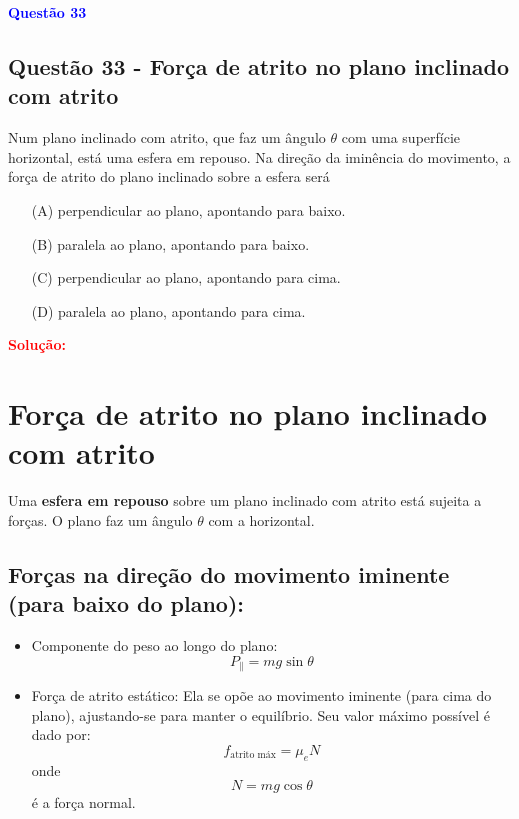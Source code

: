 \begin{flushleft}
\textbf{\textcolor{blue}{\Large Quest\~ao 33}}\\
\noindent
\subsection{Quest\~ao 33 - For\c{c}a de atrito no plano inclinado com atrito}
Num plano inclinado com atrito, que faz um ângulo $\theta$ com
uma superfície horizontal, está uma esfera em repouso. Na
direção da iminência do movimento, a força de atrito do
plano inclinado sobre a esfera será

\begin{itemize}
\item[(A)] perpendicular ao plano, apontando para baixo.
\item[(B)] paralela ao plano, apontando para baixo.
\item[(C)] perpendicular ao plano, apontando para cima.
\item[(D)] paralela ao plano, apontando para cima.
\end{itemize}

\vspace{0.5cm}

\textcolor{red}{\textbf{Solução:}}\\

\section*{Força de atrito no plano inclinado com atrito}

Uma \textbf{esfera em repouso} sobre um plano inclinado com atrito está sujeita a forças.  
O plano faz um ângulo \( \theta \) com a horizontal.

\subsection*{Forças na direção do movimento iminente (para baixo do plano):}

\begin{itemize}
  \item Componente do peso ao longo do plano:
  \begin{equation*}
    P_{\parallel} = mg \sin\theta
  \end{equation*}

  \item Força de atrito estático:  
  Ela se opõe ao movimento iminente (para cima do plano), ajustando-se para manter o equilíbrio.  
  Seu valor máximo possível é dado por:
  \begin{equation*}
    f_{\text{atrito máx}} = \mu_e N
  \end{equation*}
  onde
  \begin{equation*}
    N = mg \cos\theta
  \end{equation*}
  é a força normal.
\end{itemize}


\end{flushleft}
